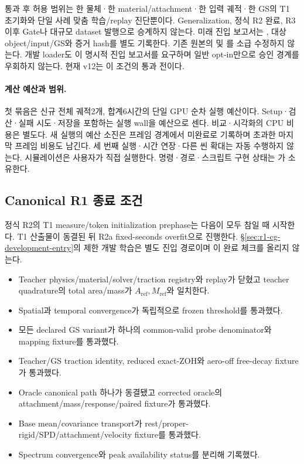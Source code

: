 \documentclass[10pt]{article}
\begin{document}
통과 후 허용 범위는 한 물체·한 material/attachment·한 입력 궤적·한 GS의
T1 초기화와 단일 사례 맞춤 학습/replay 진단뿐이다. Generalization, 정식 R2 완료,
R3 이후 Gate나 대규모 dataset 발행으로 승계하지 않는다.
미래 진입 보고서는 , 대상 object/input/GS와
증거 hash를 별도 기록한다. 기존 원본의  및
를 소급 수정하지 않는다. 개발 loader도 이 명시적 진입 보고서를 요구하며
일반 opt-in만으로 승인 경계를 우회하지 않는다. 현재 v12는 이 조건의 통과 전이다.

\paragraph{계산 예산과 범위.}
첫 묶음은 신규 전체 궤적2개, 합계6시간의 단일 GPU 순차 실행 예산이다.
Setup·검산·실패 시도·저장을 포함하는 실행 wall을 예산으로 센다. 비교·시각화의 CPU 비용은 별도다.
새 실행의 예산 소진은 프레임 경계에서 미완료로 기록하며 초과한 마지막 프레임 비용도 남긴다.
세 번째 실행·시간 연장·다른 씬 확대는 자동 수행하지 않는다. 시뮬레이션은 사용자가 직접 실행한다.
명령·경로·스크립트 구현 상태는
가 소유한다.

\subsection{Canonical R1 종료 조건}

정식 R2의 T1 measure/token initialization prephase는 다음이 모두 참일 때 시작한다.
T1 산출물이 동결된 뒤 R2a fixed-seconds overfit으로 진행한다.
\S\ref{sec:r1-cg-development-entry}의 제한 개발 학습은 별도 진입 경로이며 이 완료 체크를 올리지 않는다.
\begin{itemize}
  \item[$\square$] Teacher physics/material/solver/traction registry와 replay가 닫혔고
  teacher quadrature의 total area/mass가 \(A_{\mathrm{ref}},M_{\mathrm{ref}}\)와 일치한다.
  \item[$\square$] Spatial과 temporal convergence가 독립적으로 frozen threshold를 통과했다.
  \item[$\square$] 모든 declared GS variant가 하나의 common-valid probe denominator와 mapping fixture를 통과했다.
  \item[$\square$] Teacher/GS traction identity, reduced exact-ZOH와 aero-off free-decay fixture가 통과했다.
  \item[$\square$] Oracle canonical path 하나가 동결됐고 corrected oracle의 attachment/mass/response/paired fixture가 통과했다.
  \item[$\square$] Base mean/covariance transport가 rest/proper-rigid/SPD/attachment/velocity fixture를 통과했다.
  \item[$\square$] Spectrum convergence와 peak availability status를 분리해 기록했다.
\end{itemize}
\end{document}
